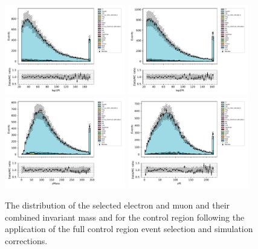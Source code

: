 \begin{figure}[tbp]
\centering
\includegraphics[width=0.47\textwidth]{figs/tzq-fullSelection-plots/plots_emu/lep1Pt.pdf}
\includegraphics[width=0.47\textwidth]{figs/tzq-fullSelection-plots/plots_emu/lep2Pt.pdf}
\\
\includegraphics[width=0.47\textwidth]{figs/tzq-fullSelection-plots/plots_emu/zMass.pdf}
\includegraphics[width=0.47\textwidth]{figs/tzq-fullSelection-plots/plots_emu/zPt.pdf}
\caption{
The distribution of the selected electron and muon \pT and their combined invariant mass and \pt for the \ttbar control region following the application of the full control region event selection and simulation corrections.
}
\label{fig:ttbarCR_leptons}
\end{figure}

